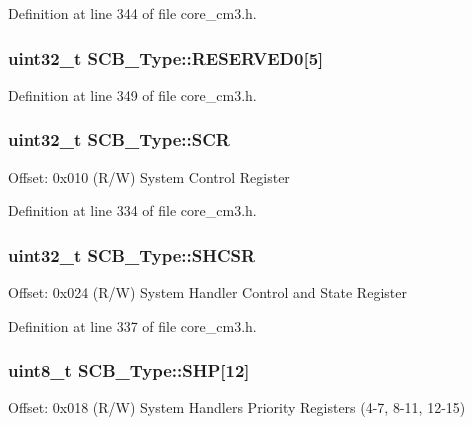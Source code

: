 Definition at line 344 of file core\+\_\+cm3.\+h.

\subsubsection[{\texorpdfstring{R\+E\+S\+E\+R\+V\+E\+D0}{RESERVED0}}]{\setlength{\rightskip}{0pt plus 5cm}uint32\+\_\+t S\+C\+B\+\_\+\+Type\+::\+R\+E\+S\+E\+R\+V\+E\+D0\mbox{[}5\mbox{]}}\hypertarget{structSCB__Type_ac89a5d9901e3748d22a7090bfca2bee6}{}\label{structSCB__Type_ac89a5d9901e3748d22a7090bfca2bee6}


Definition at line 349 of file core\+\_\+cm3.\+h.

\subsubsection[{\texorpdfstring{S\+CR}{SCR}}]{ uint32\+\_\+t S\+C\+B\+\_\+\+Type\+::\+S\+CR}\hypertarget{structSCB__Type_abfad14e7b4534d73d329819625d77a16}{}\label{structSCB__Type_abfad14e7b4534d73d329819625d77a16}
Offset\+: 0x010 (R/W) System Control Register 

Definition at line 334 of file core\+\_\+cm3.\+h.

\subsubsection[{\texorpdfstring{S\+H\+C\+SR}{SHCSR}}]{ uint32\+\_\+t S\+C\+B\+\_\+\+Type\+::\+S\+H\+C\+SR}\hypertarget{structSCB__Type_ae9891a59abbe51b0b2067ca507ca212f}{}\label{structSCB__Type_ae9891a59abbe51b0b2067ca507ca212f}
Offset\+: 0x024 (R/W) System Handler Control and State Register 

Definition at line 337 of file core\+\_\+cm3.\+h.

\subsubsection[{\texorpdfstring{S\+HP}{SHP}}]{ uint8\+\_\+t S\+C\+B\+\_\+\+Type\+::\+S\+HP\mbox{[}12\mbox{]}}\hypertarget{structSCB__Type_af6336103f8be0cab29de51daed5a65f4}{}\label{structSCB__Type_af6336103f8be0cab29de51daed5a65f4}
Offset\+: 0x018 (R/W) System Handlers Priority Registers (4-\/7, 8-\/11, 12-\/15) 

